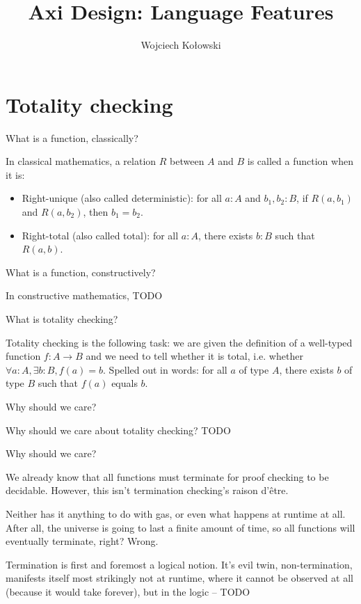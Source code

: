\documentclass{beamer}
\title{Axi Design: Language Features}
\author{Wojciech Kołowski}
\date{}
\begin{document}
\frame{\titlepage}

\section{Totality checking}

\begin{frame}{What is a function, classically?}

In classical mathematics, a relation $R$ between $A$ and $B$ is called a function when it is:

\begin{itemize}
  \item Right-unique (also called deterministic): for all $a : A$ and $b_1, b_2 : B$, if $R(a, b_1)$ and $R(a, b_2)$, then $b_1 = b_2$.
  \item Right-total (also called total): for all $a : A$, there exists $b : B$ such that $R(a, b)$.
\end{itemize}

\end{frame}

\begin{frame}{What is a function, constructively?}

In constructive mathematics, TODO
\end{frame}

\begin{frame}{What is totality checking?}

Totality checking is the following task: we are given the definition of a well-typed function $f : A \to B$ and we need to tell whether it is total, i.e. whether $\forall a : A, \exists b : B, f(a) = b$. Spelled out in words: for all $a$ of type $A$, there exists $b$ of type $B$ such that $f(a)$ equals $b$.

\end{frame}

\begin{frame}{Why should we care?}

Why should we care about totality checking? TODO
\end{frame}

\begin{frame}{Why should we care?}

We already know that all functions must terminate for proof checking to be decidable. However, this isn't termination checking's raison d'être.

\vspace{2em}

Neither has it anything to do with gas, or even what happens at runtime at all. After all, the universe is going to last a finite amount of time, so all functions will eventually terminate, right? Wrong.

\vspace{2em}

Termination is first and foremost a logical notion. It's evil twin, non-termination, manifests itself most strikingly not at runtime, where it cannot be observed at all (because it would take forever), but in the logic -- TODO

\end{frame}
\end{document}
